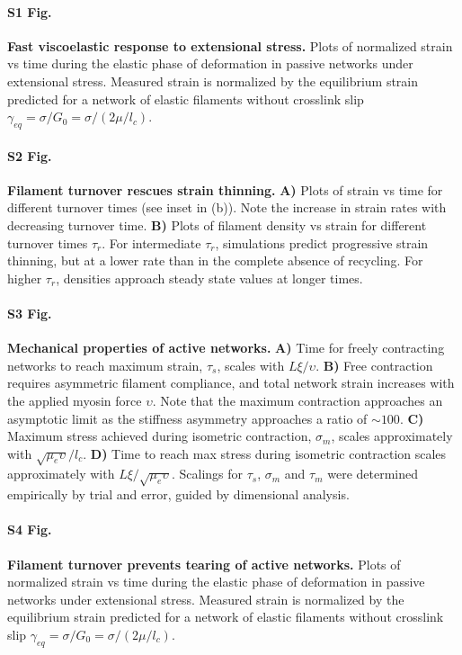 \paragraph{S1 Fig.}
\label{fig:passive_supp}
{\bf  Fast viscoelastic response to extensional stress.}  Plots of normalized strain vs time during the elastic phase of deformation in passive networks under extensional stress.  Measured strain is normalized by the equilibrium strain predicted for a network of elastic filaments without crosslink slip $\gamma_{eq} = \sigma/G_0 = \sigma/(2\mu/l_c)$.  


\paragraph{S2 Fig.}
\label{fig:thinning}
{\bf  Filament turnover rescues strain thinning.} \textbf{A)} Plots of strain vs time for different turnover times (see inset in (b)). Note the increase in strain rates with decreasing turnover time. \textbf{B)} Plots of filament density vs strain for different turnover times $\tau_r$.  For intermediate $\tau_r$, simulations predict progressive strain thinning, but at a lower rate than in the complete absence of recycling. For higher $\tau_r$, densities approach steady state values at longer times.  

\paragraph{S3 Fig.}
\label{fig:active_supp}
{\bf  Mechanical properties of active networks.}  \textbf{A)}  Time for freely contracting networks to reach maximum strain, $\tau_s$, scales with $L\xi/\upsilon$.  \textbf{B)} Free contraction requires asymmetric filament compliance, and total network strain increases with the applied myosin force $\upsilon$. Note that the maximum contraction approaches an asymptotic limit as the stiffness asymmetry approaches a ratio of $\sim 100$.   \textbf{C)}  Maximum stress achieved during isometric contraction, $\sigma_m$, scales approximately with $\sqrt{\mu_e\upsilon}/l_c$.  \textbf{D)} Time to reach max stress during isometric contraction scales approximately with $L\xi/\sqrt{\mu_e\upsilon}$. Scalings for $\tau_s$, $\sigma_m$ and $\tau_m$ were determined empirically by trial and error, guided by dimensional analysis.  

\paragraph{S4 Fig.}
\label{fig:active_tear}
{\bf  Filament turnover prevents tearing of active networks.}  Plots of normalized strain vs time during the elastic phase of deformation in passive networks under extensional stress.  Measured strain is normalized by the equilibrium strain predicted for a network of elastic filaments without crosslink slip $\gamma_{eq} = \sigma/G_0 = \sigma/(2\mu/l_c)$.  


